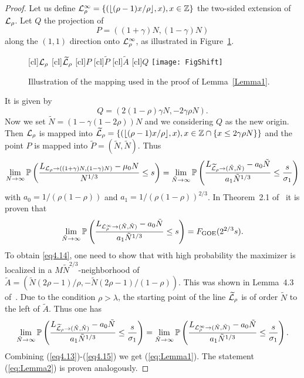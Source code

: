 \documentclass[12pt,a4paper]{article}
\numberwithin{equation}{section}
\newcommand{\GOE}{\mathrm{GOE}}
\newcommand{\Pb}{\mathbb{P}}
\newcommand{\Z}{\mathbb{Z}}
\begin{document}
\begin{proof}
Let us define ${\cal L}_\rho^\infty=\{(\lfloor(\rho-1) x/\rho\rfloor,x),x\in\Z\}$ the two-sided extension of ${\cal L}_\rho$. Let $Q$ the projection of
\begin{equation}\label{eqP}
P=((1+\gamma)N,(1-\gamma)N)
\end{equation}
along the $(1,1)$ direction onto ${\cal L}_\rho^\infty$, as illustrated in Figure~\ref{FigShift}.
%
\begin{figure}
\begin{center}
[cl]{${\cal L}_\rho$}
[cl]{$\widetilde {\cal L}_\rho$}
[cl]{$P$}
[cl]{$\widetilde P$}
[cl]{$\widetilde A$}
[cl]{$Q$}
\texttt{[image: FigShift]}
\caption{Illustration of the mapping used in the proof of Lemma~\ref{Lemma1}. }
\label{FigShift}
\end{center}
\end{figure}
%
It is given by
\begin{equation}
Q=(2(1-\rho)\gamma N,-2\gamma\rho N).
\end{equation}
Now we set $\tilde N=(1-\gamma(1-2\rho)) N$ and we considering $Q$ as the new origin. Then ${\cal L}_\rho$ is mapped into $\widetilde {\cal L}_\rho=\{(\lfloor(\rho-1) x/\rho\rfloor,x),x\in\Z\cap\{x\leq 2\gamma\rho N\}\}$ and the point $P$ is mapped into $\widetilde P=(\tilde N,\tilde N)$. Thus
\begin{equation}\label{eq4.13}
\lim_{N\to\infty}\Pb\left(\frac{L_{{\cal L}_{\rho}\to((1+\gamma) N,(1-\gamma)N)}-\mu_0 N}{N^{1/3}}\leq s\right) =
\lim_{\tilde N\to\infty}\Pb\left(\frac{L_{\widetilde {\cal L}_{\rho}\to(\tilde N,\tilde N)}-a_0 \tilde N}{a_1 \tilde N^{1/3}}\leq \frac{s}{\sigma_1}\right)
\end{equation}
with $a_0=1/(\rho(1-\rho))$ and $a_1=1/(\rho(1-\rho))^{2/3}$. In Theorem~2.1 of~\cite{FO17v1} it is proven that
\begin{equation}\label{eq4.14}
\lim_{\tilde N\to\infty}\Pb\left(\frac{L_{{\cal L}_{\rho}^\infty\to(\tilde N,\tilde N)}-a_0 \tilde N}{a_1 \tilde N^{1/3}}\leq s\right) = F_{\GOE}(2^{2/3} s).
\end{equation}
To obtain \eqref{eq4.14}, one need to show that with high probability the maximizer is localized in a $M \tilde N^{2/3}$-neighborhood of $\widetilde A=(\tilde N(2\rho-1)/\rho,-\tilde N(2\rho-1)/(1-\rho))$. This was shown in Lemma~4.3 of~\cite{FO17v1}. Due to the condition $\rho>\lambda$, the starting point of the line $\widetilde {\cal L}_\rho$ is of order $\tilde N$ to the left of $\widetilde A$. Thus one has
\begin{equation}\label{eq4.15}
\lim_{\tilde N\to\infty}\Pb\left(\frac{L_{\widetilde {\cal L}_{\rho}\to(\tilde N,\tilde N)}-a_0 \tilde N}{a_1 \tilde N^{1/3}}\leq \frac{s}{\sigma_1}\right) =
\lim_{\tilde N\to\infty}\Pb\left(\frac{L_{{\cal L}_{\rho}^\infty\to(\tilde N,\tilde N)}-a_0 \tilde N}{a_1 \tilde N^{1/3}}\leq \frac{s}{\sigma_1}\right).
\end{equation}
Combining (\ref{eq4.13})-(\ref{eq4.15}) we get (\ref{eq:Lemma1}). The statement (\ref{eq:Lemma2}) is proven analogously.
\end{proof}
\end{document}
